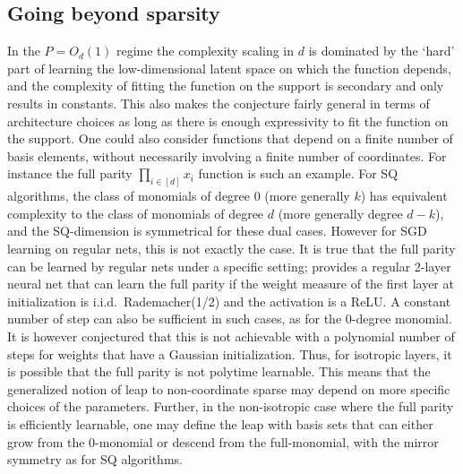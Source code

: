 \documentclass[11pt]{article}
\newcommand{\<}{\langle}
\renewcommand{\>}{\rangle}
\theoremstyle{definition}
\begin{document}
\subsection{Going beyond sparsity}
\label{app:beyond_sparse}

In the $P=O_d(1)$ regime the complexity scaling in $d$ is dominated by the `hard' part of learning the low-dimensional latent space on which the function depends, and the complexity of fitting the function on the support is secondary and only results in constants. This also makes the conjecture fairly general in terms of architecture choices as long as there is enough expressivity to fit the function on the support. One could also consider functions that depend on a finite number of basis elements, without necessarily involving a finite number of coordinates. For instance the full parity $\prod_{i\in [d]}x_i$ function is such an example. For SQ algorithms, the class of monomials of degree 0 (more generally $k$) has equivalent complexity to the class of monomials of degree $d$ (more generally degree $d-k$), and the SQ-dimension is symmetrical for these dual cases. However for SGD learning on regular nets, this is not exactly the case. It is true that the full parity can be learned by regular nets under a specific setting; \cite{abbe2022non} provides a regular 2-layer neural net that can learn the full parity if the weight measure of the first layer at initialization is i.i.d.\ Rademacher(1/2) and the activation is a ReLU. A constant number of step can also be sufficient in such cases, as for the 0-degree monomial. It is however conjectured that this is not achievable with a polynomial number of steps for weights that have a Gaussian initialization. Thus, for isotropic layers, it is possible that the full parity is not polytime learnable. This means that the generalized notion of leap to non-coordinate sparse may depend on more specific choices of the parameters. Further, in the non-isotropic case where the full parity is efficiently learnable, one may define the leap with basis sets that can either grow from the 0-monomial or descend from the full-monomial, with the mirror symmetry as for SQ algorithms.
\end{document}
